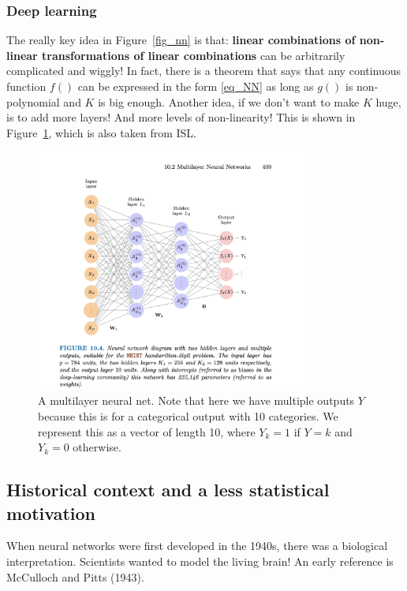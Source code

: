 \subsubsection{Deep learning}

The really key idea in Figure~\ref{fig_nn} is that: \textbf{linear combinations of non-linear transformations of linear combinations} can be arbitrarily complicated and wiggly! In fact, there is a theorem that says that any continuous function $f()$ can be expressed in the form \eqref{eq_NN} as long as $g()$ is non-polynomial and $K$ is big enough. Another idea, if we don't want to make $K$ huge, is to add more layers! And more levels of non-linearity! This is shown in Figure~\ref{fig_deep}, which is also taken from ISL. 

\begin{figure}[h]
\centering
\includegraphics[width=0.8\textwidth]{442_lecs/deep.png}
\caption{A multilayer neural net. Note that here we have multiple outputs $Y$ because this is for a categorical output with 10 categories. We represent this as a vector of length 10, where $Y_k=1$ if $Y=k$ and $Y_k=0$ otherwise.}
\label{fig_deep}
\end{figure} 

\subsection{Historical context and a less statistical motivation}

When neural networks were first developed in the 1940s, there was a biological interpretation. Scientists wanted to model the living brain! An early reference is McCulloch and Pitts (1943). 

